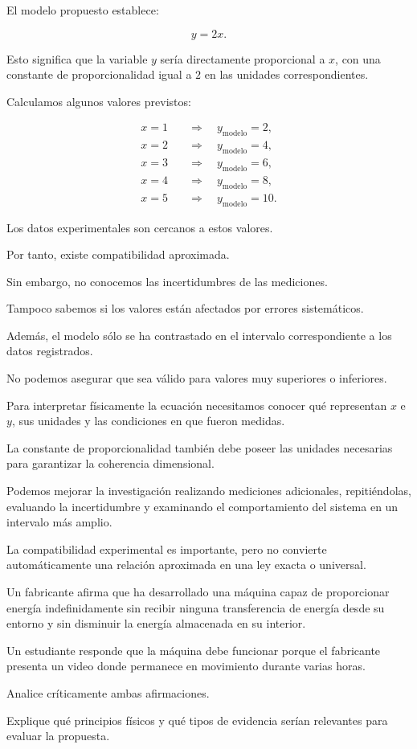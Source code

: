 \begin{explicacion}
El modelo propuesto establece:

\[y=2x.\]

Esto significa que la variable \(y\) sería directamente proporcional a \(x\), con una constante de proporcionalidad igual a \(2\) en las unidades correspondientes.

Calculamos algunos valores previstos:

\[
\begin{aligned}
x=1 &\quad\Rightarrow\quad y_{\mathrm{modelo}}=2,\\
x=2 &\quad\Rightarrow\quad y_{\mathrm{modelo}}=4,\\
x=3 &\quad\Rightarrow\quad y_{\mathrm{modelo}}=6,\\
x=4 &\quad\Rightarrow\quad y_{\mathrm{modelo}}=8,\\
x=5 &\quad\Rightarrow\quad y_{\mathrm{modelo}}=10.
\end{aligned}
\]

Los datos experimentales son cercanos a estos valores.

Por tanto, existe compatibilidad aproximada.

Sin embargo, no conocemos las incertidumbres de las mediciones.

Tampoco sabemos si los valores están afectados por errores sistemáticos.

Además, el modelo sólo se ha contrastado en el intervalo correspondiente a los datos registrados.

No podemos asegurar que sea válido para valores muy superiores o inferiores.

Para interpretar físicamente la ecuación necesitamos conocer qué representan \(x\) e \(y\), sus unidades y las condiciones en que fueron medidas.

La constante de proporcionalidad también debe poseer las unidades necesarias para garantizar la coherencia dimensional.

Podemos mejorar la investigación realizando mediciones adicionales, repitiéndolas, evaluando la incertidumbre y examinando el comportamiento del sistema en un intervalo más amplio.

La compatibilidad experimental es importante, pero no convierte automáticamente una relación aproximada en una ley exacta o universal.
\end{explicacion}


\begin{ejercicio}
Un fabricante afirma que ha desarrollado una máquina capaz de proporcionar energía indefinidamente sin recibir ninguna transferencia de energía desde su entorno y sin disminuir la energía almacenada en su interior.

Un estudiante responde que la máquina debe funcionar porque el fabricante presenta un video donde permanece en movimiento durante varias horas.

Analice críticamente ambas afirmaciones.

Explique qué principios físicos y qué tipos de evidencia serían relevantes para evaluar la propuesta.
\end{ejercicio}

